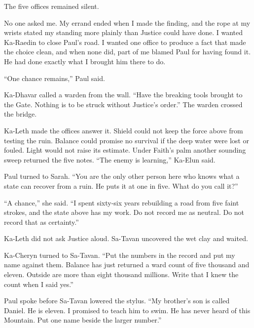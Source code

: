 The five offices remained silent.\par

No one asked me. My errand ended when I made the finding, and the rope at my wrists stated my standing more plainly than Justice could have done. I wanted Ka-Raedin to close Paul's road. I wanted one office to produce a fact that made the choice clean, and when none did, part of me blamed Paul for having found it. He had done exactly what I brought him there to do.\par

``One chance remains,'' Paul said.\par

Ka-Dhavar called a warden from the wall. ``Have the breaking tools brought to the Gate. Nothing is to be struck without Justice's order.'' The warden crossed the bridge.\par

Ka-Leth made the offices answer it. Shield could not keep the force above from testing the ruin. Balance could promise no survival if the deep water were lost or fouled. Light would not raise its estimate. Under Faith's palm another sounding sweep returned the five notes. ``The enemy is learning,'' Ka-Elun said.\par

Paul turned to Sarah. ``You are the only other person here who knows what a state can recover from a ruin. He puts it at one in five. What do you call it?''\par

``A chance,'' she said. ``I spent sixty-six years rebuilding a road from five faint strokes, and the state above has my work. Do not record me as neutral. Do not record that as certainty.''\par

Ka-Leth did not ask Justice aloud. Sa-Tavan uncovered the wet clay and waited.\par

Ka-Cheryn turned to Sa-Tavan. ``Put the numbers in the record and put my name against them. Balance has just returned a ward count of five thousand and eleven. Outside are more than eight thousand millions. Write that I knew the count when I said yes.''\par

Paul spoke before Sa-Tavan lowered the stylus. ``My brother's son is called Daniel. He is eleven. I promised to teach him to swim. He has never heard of this Mountain. Put one name beside the larger number.''\par

